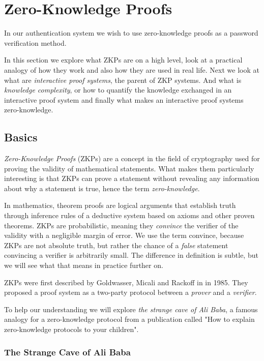 \section{Zero-Knowledge Proofs}
In our authentication system we wish to use zero-knowledge proofs as a password verification method.

In this section we explore what ZKPs are on a high level, look at a practical analogy of how they work and also how they are used in real life.
Next we look at what are \textit{interactive proof systems}, the parent of ZKP systems.
And what is \textit{knowledge complexity}, or how to quantify the knowledge exchanged in an interactive proof system and finally what makes an interactive proof systems zero-knowledge.

\subsection{Basics}
\textit{Zero-Knowledge Proofs} (ZKPs) are a concept in the field of cryptography used for proving the validity of mathematical statements.
What makes them particularly interesting is that ZKPs can prove a statement without revealing any information about why a statement is true, hence the term \textit{zero-knowledge}.

In mathematics, theorem proofs are logical arguments that establish truth through inference rules of a deductive system based on axioms and other proven theorems.
ZKPs are probabilistic, meaning they \textit{convince} the verifier of the validity with a negligible margin of error.
We use the term convince, because ZKPs are not absolute truth, but rather the chance of a \textit{false} statement convincing a verifier is arbitrarily small. 
The difference in definition is subtle, but we will see what that means in practice further on.

ZKPs were first described by Goldwasser, Micali and Rackoff in \cite{goldwasser1989knowledge} in 1985. 
They proposed a proof system as a two-party protocol between a \textit{prover} and a \textit{verifier}.

To help our understanding we will explore \cite{10.1007/0-387-34805-0_60} \textit{the strange cave of Ali Baba}, a famous analogy for a zero-knowledge protocol from a publication called "How to explain zero-knowledge protocols to your children".

\newpage
\subsubsection{The Strange Cave of Ali Baba}

